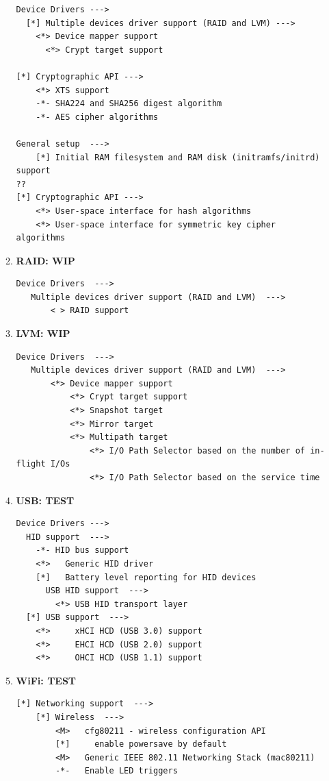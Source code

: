 \documentclass[10pt, a4paper, onecolumn, oneside, titlepage, openany]{book}
\begin{document}
\begin{enumerate}
\begin{enumerate}
\begin{Verbatim}[commandchars=\\\{\}]
Device Drivers --->
  [*] Multiple devices driver support (RAID and LVM) --->
    <*> Device mapper support
      <*> Crypt target support

[*] Cryptographic API --->
    <*> XTS support
    -*- SHA224 and SHA256 digest algorithm
    -*- AES cipher algorithms

General setup  --->
    [*] Initial RAM filesystem and RAM disk (initramfs/initrd) support
??
[*] Cryptographic API --->
    <*> User-space interface for hash algorithms
    <*> User-space interface for symmetric key cipher algorithms
\end{Verbatim}
        \item \textbf{RAID: WIP}
\begin{Verbatim}[commandchars=\\\{\}]
Device Drivers  --->
   Multiple devices driver support (RAID and LVM)  --->
       < > RAID support
\end{Verbatim}
        \item \textbf{LVM: WIP}
\begin{Verbatim}[commandchars=\\\{\}]
Device Drivers  --->
   Multiple devices driver support (RAID and LVM)  --->
       <*> Device mapper support
           <*> Crypt target support
           <*> Snapshot target
           <*> Mirror target
           <*> Multipath target
               <*> I/O Path Selector based on the number of in-flight I/Os
               <*> I/O Path Selector based on the service time
\end{Verbatim}
        \item \textbf{USB: TEST}
\begin{Verbatim}[commandchars=\\\{\}]
Device Drivers --->
  HID support  --->
    -*- HID bus support
    <*>   Generic HID driver
    [*]   Battery level reporting for HID devices
      USB HID support  --->
        <*> USB HID transport layer
  [*] USB support  --->
    <*>     xHCI HCD (USB 3.0) support
    <*>     EHCI HCD (USB 2.0) support
    <*>     OHCI HCD (USB 1.1) support
\end{Verbatim}
        \item \textbf{WiFi: TEST}
\begin{Verbatim}[commandchars=\\\{\}]
[*] Networking support  --->
    [*] Wireless  --->
        <M>   cfg80211 - wireless configuration API
        [*]     enable powersave by default
        <M>   Generic IEEE 802.11 Networking Stack (mac80211)
        -*-   Enable LED triggers


\end{Verbatim}
\end{enumerate}
\end{enumerate}
\end{document}
